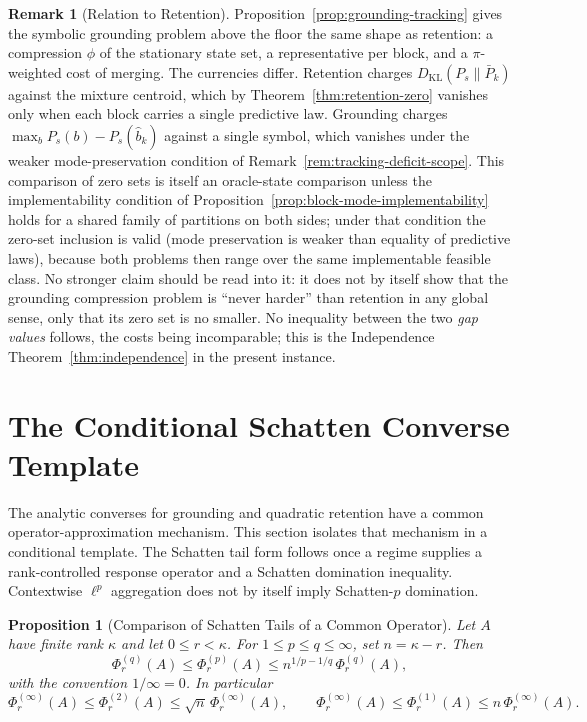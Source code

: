 \documentclass[12pt]{article}
\newtheorem{proposition}[theorem]{Proposition}
\theoremstyle{definition}
\newtheorem{remark}[theorem]{Remark}
\begin{document}
\begin{remark}[Relation to Retention]
\label{rem:tracking-vs-retention}
Proposition~\ref{prop:grounding-tracking} gives the symbolic grounding problem
above the floor the same shape as retention: a compression $\phi$ of the
stationary state set, a representative per block, and a $\pi$-weighted cost of
merging.  The currencies differ.  Retention charges
$D_{\mathrm{KL}}(P_s\|\bar P_k)$ against the mixture centroid, which by
Theorem~\ref{thm:retention-zero} vanishes only when each block carries a single
predictive law.  Grounding charges $\max_bP_s(b)-P_s(\hat b_k)$ against a
single symbol, which vanishes under the weaker mode-preservation condition of
Remark~\ref{rem:tracking-deficit-scope}.  This comparison of zero sets is
itself an oracle-state comparison unless the implementability condition of
Proposition~\ref{prop:block-mode-implementability} holds for a shared family
of partitions on both sides; under that condition the zero-set inclusion is
valid (mode preservation is weaker than equality of predictive laws), because
both problems then range over the same implementable feasible class.  No
stronger claim should be read into it: it does not by itself show that the
grounding compression problem is ``never harder'' than retention in any
global sense, only that its zero set is no smaller.  No inequality between
the two \emph{gap values} follows, the costs being incomparable; this is the
Independence Theorem~\ref{thm:independence} in the present instance.
\end{remark}

\section{The Conditional Schatten Converse Template}
\label{sec:schatten}

The analytic converses for grounding and quadratic retention have a common
operator-approximation mechanism.  This section isolates that mechanism in a
conditional template.  The Schatten tail form follows once a regime supplies a
rank-controlled response operator and a Schatten domination inequality.
Contextwise $\ell^p$ aggregation does not by itself imply Schatten-$p$
domination.

\begin{proposition}[Comparison of Schatten Tails of a Common Operator]
\label{prop:common-operator}
Let $A$ have finite rank $\kappa$ and let $0\le r<\kappa$.  For
$1\le p\le q\le\infty$, set $n=\kappa-r$.  Then
\[
\Phi^{(q)}_r(A)
\le
\Phi^{(p)}_r(A)
\le
n^{1/p-1/q}\,
\Phi^{(q)}_r(A),
\]
with the convention $1/\infty=0$.  In particular
\[
\Phi^{(\infty)}_r(A)
\le
\Phi^{(2)}_r(A)
\le
\sqrt n\,\Phi^{(\infty)}_r(A),
\qquad
\Phi^{(\infty)}_r(A)
\le
\Phi^{(1)}_r(A)
\le
n\,\Phi^{(\infty)}_r(A).
\]
\end{proposition}
\end{document}
